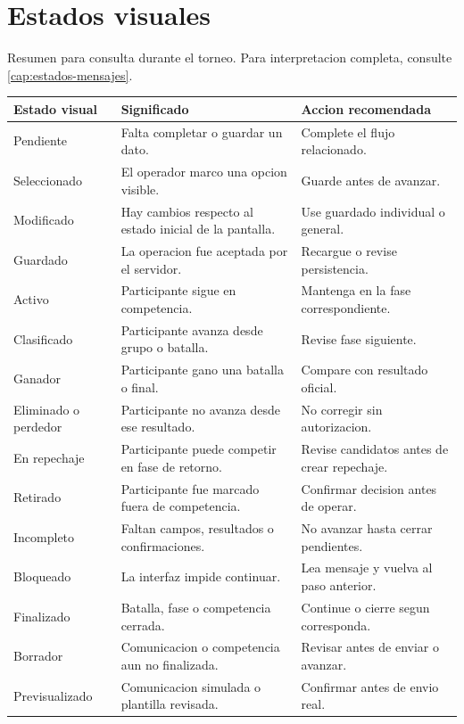 \chapter{Estados visuales}
\label{anexo:estados-visuales}

Resumen para consulta durante el torneo. Para interpretacion completa, consulte \cref{cap:estados-mensajes}.

\begin{longtable}{p{4.0cm}p{6.6cm}p{4.3cm}}
\toprule
Estado visual & Significado & Accion recomendada\\
\midrule
\endhead
Pendiente & Falta completar o guardar un dato. & Complete el flujo relacionado.\\
Seleccionado & El operador marco una opcion visible. & Guarde antes de avanzar.\\
Modificado & Hay cambios respecto al estado inicial de la pantalla. & Use guardado individual o general.\\
Guardado & La operacion fue aceptada por el servidor. & Recargue o revise persistencia.\\
Activo & Participante sigue en competencia. & Mantenga en la fase correspondiente.\\
Clasificado & Participante avanza desde grupo o batalla. & Revise fase siguiente.\\
Ganador & Participante gano una batalla o final. & Compare con resultado oficial.\\
Eliminado o perdedor & Participante no avanza desde ese resultado. & No corregir sin autorizacion.\\
En repechaje & Participante puede competir en fase de retorno. & Revise candidatos antes de crear repechaje.\\
Retirado & Participante fue marcado fuera de competencia. & Confirmar decision antes de operar.\\
Incompleto & Faltan campos, resultados o confirmaciones. & No avanzar hasta cerrar pendientes.\\
Bloqueado & La interfaz impide continuar. & Lea mensaje y vuelva al paso anterior.\\
Finalizado & Batalla, fase o competencia cerrada. & Continue o cierre segun corresponda.\\
Borrador & Comunicacion o competencia aun no finalizada. & Revisar antes de enviar o avanzar.\\
Previsualizado & Comunicacion simulada o plantilla revisada. & Confirmar antes de envio real.\\

\end{longtable}
